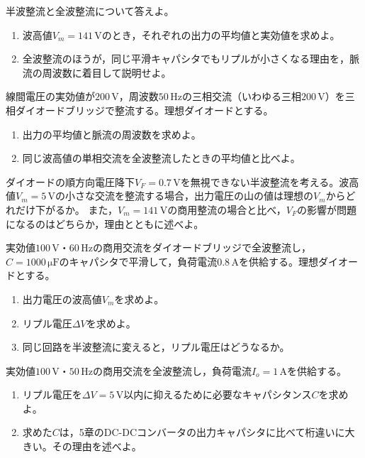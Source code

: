 \begin{章末問題}
\item \label{ex8.1}半波整流と全波整流について答えよ。
\begin{enumerate}
\item[(a)] 波高値$V_m = 141$\,Vのとき，それぞれの出力の平均値と実効値を求めよ。
\item[(b)] 全波整流のほうが，同じ平滑キャパシタでもリプルが小さくなる理由を，脈流の周波数に着目して説明せよ。
\end{enumerate}

\item \label{ex8.2}線間電圧の実効値が$200$\,V，周波数$50$\,Hzの三相交流（いわゆる三相$200$\,V）を三相ダイオードブリッジで整流する。理想ダイオードとする。
\begin{enumerate}
\item[(a)] 出力の平均値と脈流の周波数を求めよ。
\item[(b)] 同じ波高値の単相交流を全波整流したときの平均値と比べよ。
\end{enumerate}

\item \label{ex8.3}ダイオードの順方向電圧降下$V_F = 0.7$\,Vを無視できない半波整流を考える。波高値$V_m = 5$\,Vの小さな交流を整流する場合，出力電圧の山の値は理想の$V_m$からどれだけ下がるか。
また，$V_m = 141$\,Vの商用整流の場合と比べ，$V_F$の影響が問題になるのはどちらか，理由とともに述べよ。

\item \label{ex8.4}実効値$100$\,V・$60$\,Hzの商用交流をダイオードブリッジで全波整流し，$C = 1000\,\mathrm{\mu F}$のキャパシタで平滑して，負荷電流$0.8$\,Aを供給する。理想ダイオードとする。
\begin{enumerate}
\item[(a)] 出力電圧の波高値$V_m$を求めよ。
\item[(b)] リプル電圧$\mathit{\Delta}V$を求めよ。
\item[(c)] 同じ回路を半波整流に変えると，リプル電圧はどうなるか。
\end{enumerate}

\item \label{ex8.5}実効値$100$\,V・$50$\,Hzの商用交流を全波整流し，負荷電流$I_o = 1$\,Aを供給する。
\begin{enumerate}
\item[(a)] リプル電圧を$\mathit{\Delta}V = 5$\,V以内に抑えるために必要なキャパシタンス$C$を求めよ。
\item[(b)] 求めた$C$は，5章のDC-DCコンバータの出力キャパシタに比べて桁違いに大きい。その理由を述べよ。
\end{enumerate}


\end{章末問題}
